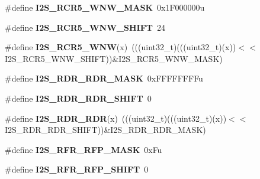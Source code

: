\begin{DoxyCompactItemize}
\item 
\#define {\bfseries I2\+S\+\_\+\+R\+C\+R5\+\_\+\+W\+N\+W\+\_\+\+M\+A\+SK}~0x1\+F000000u\hypertarget{group__I2S__Register__Masks_gab6d2caff41f65c7c2c24510803d8000f}{}\label{group__I2S__Register__Masks_gab6d2caff41f65c7c2c24510803d8000f}

\item 
\#define {\bfseries I2\+S\+\_\+\+R\+C\+R5\+\_\+\+W\+N\+W\+\_\+\+S\+H\+I\+FT}~24\hypertarget{group__I2S__Register__Masks_gade327b408882d6b24c668c4d7d4c52c8}{}\label{group__I2S__Register__Masks_gade327b408882d6b24c668c4d7d4c52c8}

\item 
\#define {\bfseries I2\+S\+\_\+\+R\+C\+R5\+\_\+\+W\+NW}(x)~(((uint32\+\_\+t)(((uint32\+\_\+t)(x))$<$$<$I2\+S\+\_\+\+R\+C\+R5\+\_\+\+W\+N\+W\+\_\+\+S\+H\+I\+FT))\&I2\+S\+\_\+\+R\+C\+R5\+\_\+\+W\+N\+W\+\_\+\+M\+A\+SK)\hypertarget{group__I2S__Register__Masks_ga2fe4fc2933c0338095194c6c09bb0512}{}\label{group__I2S__Register__Masks_ga2fe4fc2933c0338095194c6c09bb0512}

\item 
\#define {\bfseries I2\+S\+\_\+\+R\+D\+R\+\_\+\+R\+D\+R\+\_\+\+M\+A\+SK}~0x\+F\+F\+F\+F\+F\+F\+F\+Fu\hypertarget{group__I2S__Register__Masks_gaccf614975eae2e2df22dafe25a0f15e5}{}\label{group__I2S__Register__Masks_gaccf614975eae2e2df22dafe25a0f15e5}

\item 
\#define {\bfseries I2\+S\+\_\+\+R\+D\+R\+\_\+\+R\+D\+R\+\_\+\+S\+H\+I\+FT}~0\hypertarget{group__I2S__Register__Masks_ga044f3938825909104af369aa0c62f2f5}{}\label{group__I2S__Register__Masks_ga044f3938825909104af369aa0c62f2f5}

\item 
\#define {\bfseries I2\+S\+\_\+\+R\+D\+R\+\_\+\+R\+DR}(x)~(((uint32\+\_\+t)(((uint32\+\_\+t)(x))$<$$<$I2\+S\+\_\+\+R\+D\+R\+\_\+\+R\+D\+R\+\_\+\+S\+H\+I\+FT))\&I2\+S\+\_\+\+R\+D\+R\+\_\+\+R\+D\+R\+\_\+\+M\+A\+SK)\hypertarget{group__I2S__Register__Masks_ga116e8038e227181784edc27efd68458d}{}\label{group__I2S__Register__Masks_ga116e8038e227181784edc27efd68458d}

\item 
\#define {\bfseries I2\+S\+\_\+\+R\+F\+R\+\_\+\+R\+F\+P\+\_\+\+M\+A\+SK}~0x\+Fu\hypertarget{group__I2S__Register__Masks_ga47151099035d8d850a3fb194cdb35bb2}{}\label{group__I2S__Register__Masks_ga47151099035d8d850a3fb194cdb35bb2}

\item 
\#define {\bfseries I2\+S\+\_\+\+R\+F\+R\+\_\+\+R\+F\+P\+\_\+\+S\+H\+I\+FT}~0\hypertarget{group__I2S__Register__Masks_ga7ffec4d33d58891c8388e1e85b206f58}{}\label{group__I2S__Register__Masks_ga7ffec4d33d58891c8388e1e85b206f58}


\end{DoxyCompactItemize}
